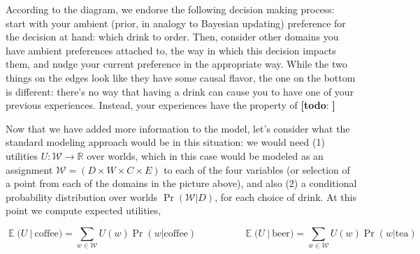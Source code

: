 \documentclass{article}
\theoremstyle{plain}
\theoremstyle{definition}
\theoremstyle{remark}
\newcommand\lab[1]{(#1)(lab-#1)}
\newcommand{\todo}[1]{{\color{red}\large\textbf{[todo}: {\normalsize\itshape#1}\textbf{]}}}
\begin{document}
	\begin{center}
	\end{center}
	According to the diagram, we endorse the following decision making process: start with your ambient (prior, in analogy to Bayesian updating) preference for the decision at hand: which drink to order. Then, consider other domains you have ambient preferences attached to, the way in which this decision impacts them, and nudge your current preference in the appropriate way. While the two things on the edges look like they have some causal flavor, the one on the bottom is different: there's no way that having a drink can cause you to have one of your previous experiences. Instead, your experiences have the property of \todo{}
	
	
	Now that we have added more information to the model, let's consider what the standard modeling approach would be in this situation: we would need (1) utilities $U : \mathcal W \to \mathbb R$ over worlds, which in this case would be modeled as an assignment $\mathcal W = (D \times W \times C \times E)$ to each of the four variables (or selection of a point from each of the domains in the picture above), and also (2) a conditional probability distribution over worlds $\Pr(\mathcal W | D)$, for each choice of drink. At this point we compute expected utilities,
	
	\[  \mathop{\mathbb E} \Big(U ~\Big|~ \text{coffee}\Big) = \sum\limits_{w \in \mathcal W} U(w) \Pr(w | \mathrm{coffee}) 
	\hspace{2cm} 
	\mathop{\mathbb E} \Big(U ~\Big|~ \text{beer}\Big) = \sum\limits_{w \in \mathcal W} U(w) \Pr(w | \mathrm{tea}) \]
	
\end{document}
